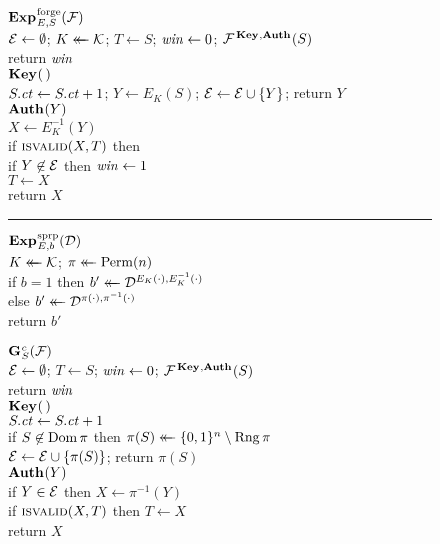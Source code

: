 \begin{figure}[t]
  \newcommand{\isvalid}{\schemefont{isvalid}}
  {
    \underline{$\Exp{\forge}_{E,S}(\advF)$}\\[2pt]
      $\mathcal{E} \gets \emptyset$;
      $K \mathrel{\leftarrow\mkern-14mu\leftarrow} \mathcal{K}$;
      $T \gets S$;
      $\mathit{win} \gets 0$;
      $\mathcal{F}^{\,\textbf{Key}\hspace{0.5pt},\textbf{Auth}\hspace{0.5pt}}(S)$\\
      return $\mathit{win}$
    \\[6pt]
    \underline{$\textbf{Key}\hspace{0.5pt}(\,)$}\\[2pt]
      $S.\mathit{ct} \gets S.\mathit{ct} + 1$;
      $Y \gets E_K(S)$;
      $\mathcal{E} \gets \mathcal{E} \cup \{Y\}$;
      return $Y$
    \\[6pt]
    \underline{$\textbf{Auth}\hspace{0.5pt}(Y)$}\\[2pt]
      $X \gets E_K^{-1}(Y)$\\
      if $\isvalid(X,T)$ then\\
      \tab if $Y \not\in \mathcal{E}$ then $\mathit{win} \gets 1$\\
      \tab $T \gets X$\\
      return $X$\\[2pt]
    \hrule
    \vspace{5pt}
    \underline{$\Exp{\sprp}_{E,b}(\advD)$}\\[2pt]
      $K \mathrel{\leftarrow\mkern-14mu\leftarrow} \mathcal{K}$; $\pi \mathrel{\leftarrow\mkern-14mu\leftarrow} \mathrm{Perm}(n)$\\
      if $b=1$ then $b' \mathrel{\leftarrow\mkern-14mu\leftarrow} \mathcal{D}^{E_K(\cdot),E_K^{-1}(\cdot)}$\\
      else $b' \mathrel{\leftarrow\mkern-14mu\leftarrow} \mathcal{D}^{\pi(\cdot),\pi^{-1}(\cdot)}$\\
      return $b'$
  }
  {
    \underline{$\textbf{G}\hspace{0.5pt}^c_S(\mathcal{F})$}\\[2pt]
      $\mathcal{E} \gets \emptyset$;
      $T \gets S$;
      $\mathit{win} \gets 0$;
      $\mathcal{F}^{\,\textbf{Key}\hspace{0.5pt},\textbf{Auth}\hspace{0.5pt}}(S)$\\
      return $\mathit{win}$
    \\[6pt]
    \underline{$\textbf{Key}\hspace{0.5pt}(\,)$}\\[2pt]
      $S.\mathit{ct} \gets S.\mathit{ct} + 1$\\
      if $S \not\in \mathrm{Dom}\, \pi$ then $\pi(S) \mathrel{\leftarrow\mkern-14mu\leftarrow} \{0,1\}^n \setminus \mathrm{Rng}\, \pi$\\
      $\mathcal{E} \gets \mathcal{E} \cup \{\pi(S)\}$;
      return $\pi(S)$
    \\[6pt]
    \underline{$\textbf{Auth}\hspace{0.5pt}(Y)$}\\[2pt]
      if $Y \in \mathcal{E}$ then $X \gets \pi^{-1}(Y)$\\
      \tab if $\isvalid(X,T)$ then $T \gets X$\\
      \tab return $X$\\
}
\end{figure}
